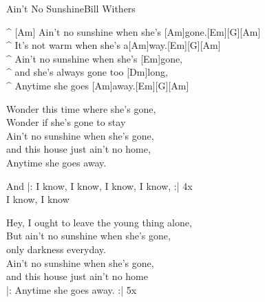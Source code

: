 \begin{song}{Ain't No Sunshine}{Bill Withers}


\begin{guitar}
^ [Am]  Ain't no sunshine when she's [Am]gone.[Em][G][Am]\\
^ It's not warm when she's a[Am]way.[Em][G][Am]\\
^ Ain't no sunshine when she's [Em]gone, \\
^ and she's always gone too [Dm]long,\\
^ Anytime she goes [Am]away.[Em][G][Am]\\
\end{guitar}

\begin{guitar}
Wonder this time where she's gone,\\
Wonder if she's gone to stay\\
Ain't no sunshine when she's gone,\\
and this house just ain't no home,\\
Anytime she goes away.\\
\end{guitar}


\begin{guitar}
And |: I know, I know, I know, I know, :| 4x\\
I know, I know\\
\end{guitar}

\begin{guitar}
Hey, I ought to leave the young thing alone,\\
But ain't no sunshine when she's gone,\\
only darkness everyday.\\
Ain't no sunshine when she's gone, \\
and this house just ain't no home\\
|: Anytime she goes away. :| 5x\\
\end{guitar}
\end{song}
